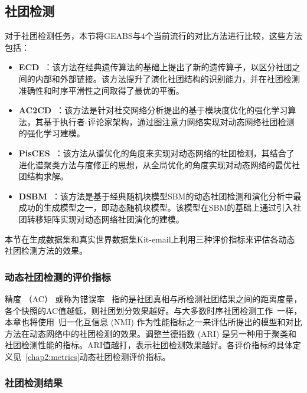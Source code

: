 \subsection{社团检测}
对于社团检测任务，本节将GEABS与$4$个当前流行的对比方法进行比较，这些方法包括：
\begin{itemize}
  \item \textbf{ECD~\cite{liu2019evolutionary}}：该方法在经典遗传算法的基础上提出了新的遗传算子，以区分社团之间的内部和外部链接。该方法提升了演化社团结构的识别能力，并在社团检测准确性和时序平滑性之间取得了最优的平衡。
    \item \textbf{AC2CD~\cite{COSTA2023110202}}：该方法是针对社交网络分析提出的基于模块度优化的强化学习算法，其基于执行者-评论家架构，通过图注意力网络实现对动态网络社团检测的强化学习建模。
  \item \textbf{PisCES~\cite{liu2018using}}：该方法从谱优化的角度来实现对动态网络的社团检测，其结合了进化谱聚类方法与度修正的思想，从全局优化的角度实现对动态网络的最优社团结构求解。
  \item \textbf{DSBM~\cite{yang2011detecting}}：该方法是基于经典随机块模型SBM的动态社团检测和演化分析中最成功的生成模型之一，即动态随机块模型。该模型在SBM的基础上通过引入社团转移矩阵实现对动态网络社团演化的建模。
\end{itemize}


本节在生成数据集和真实世界数据集Kit-email上利用三种评价指标来评估各动态社团检测方法的效果。



\subsubsection{动态社团检测的评价指标}
{精度} （AC） 或称为错误率~\cite{lin2009analyzing} 指的是社团真相与所检测社团结果之间的距离度量，各个快照的AC值越低，则社团划分效果越好。与大多数时序社团检测工作~\cite{hartmann2016clustering}一样，本章也将使用~{归一化互信息} (NMI) 作为性能指标之一来评估所提出的模型和对比方法在动态网络中的社团检测的效果。{调整兰德指数} (ARI) 是另一种用于聚类和社团检测性能的指标。ARI值越打，表示社团检测效果越好。各评价指标的具体定义见~\ref{chap2:metrics}动态社团检测评价指标。

\subsubsection{社团检测结果}


